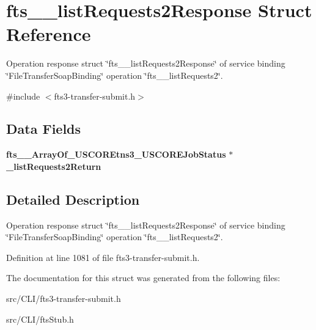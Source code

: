 \section{fts\_\-\_\-listRequests2Response Struct Reference}
\label{structfts____listRequests2Response}


Operation response struct \char`\"{}fts\_\-\_\-listRequests2Response\char`\"{} of service binding \char`\"{}FileTransferSoapBinding\char`\"{} operation \char`\"{}fts\_\-\_\-listRequests2\char`\"{}.  




{\ttfamily \#include $<$fts3-\/transfer-\/submit.h$>$}

\subsection*{Data Fields}
\begin{DoxyCompactItemize}
\item 
{\bf fts\_\-\_\-ArrayOf\_\-USCOREtns3\_\-USCOREJobStatus} $\ast$ {\bfseries \_\-listRequests2Return}\label{structfts____listRequests2Response_a6fefa65626d8cb369b2171e6d459528e}

\end{DoxyCompactItemize}


\subsection{Detailed Description}
Operation response struct \char`\"{}fts\_\-\_\-listRequests2Response\char`\"{} of service binding \char`\"{}FileTransferSoapBinding\char`\"{} operation \char`\"{}fts\_\-\_\-listRequests2\char`\"{}. 

Definition at line 1081 of file fts3-\/transfer-\/submit.h.



The documentation for this struct was generated from the following files:\begin{DoxyCompactItemize}
\item 
src/CLI/fts3-\/transfer-\/submit.h\item 
src/CLI/ftsStub.h\end{DoxyCompactItemize}
